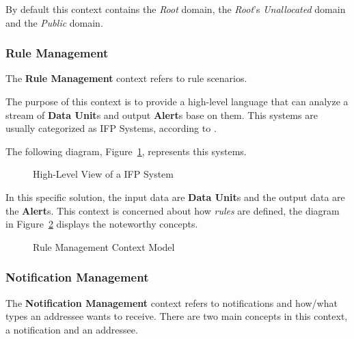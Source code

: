 By default this context contains the \textit{Root} domain, the \textit{Root}'s  \textit{Unallocated} domain and the \textit{Public} domain.

\subsubsection*{Rule Management}
\label{subsubsec:design:domain:bounded_contexts:rule}

The \textbf{Rule Management} context refers to rule scenarios.

The purpose of this context is to provide a high-level language that can analyze a stream of \textbf{Data Unit}s and output \textbf{Alert}s base on them. This systems are usually categorized as \gls{IFP} Systems, according to \cite{cugola2012processing}.

The following diagram, Figure~\ref{fig:design:domain:bounded_contexts:rule:ifp}, represents this systems.

\begin{figure}[H]
   \centering
  \resizebox{\columnwidth}{!}
  {
     
  }
  \caption[High-Level View of a \gls{IFP} System]{High-Level View of a \gls{IFP} System}
  \label{fig:design:domain:bounded_contexts:rule:ifp}
\end{figure}

In this specific solution, the input data are \textbf{Data Unit}s and the output data are the \textbf{Alert}s. This context is concerned about how \textit{rules} are defined, the diagram in Figure~\ref{fig:design:domain:bounded_contexts:rule:diagram} displays the noteworthy concepts.

\begin{figure}[H]
   \centering
  \resizebox{\columnwidth}{!}
  {
     
  }
  \caption[Rule Management Context Model]{Rule Management Context Model}
  \label{fig:design:domain:bounded_contexts:rule:diagram}
\end{figure}

\subsubsection*{Notification Management}
\label{subsubsec:design:domain:bounded_contexts:notification}

The \textbf{Notification Management} context refers to notifications and how/what types an addressee wants to receive. There are two main concepts in this context, a notification and an addressee.

